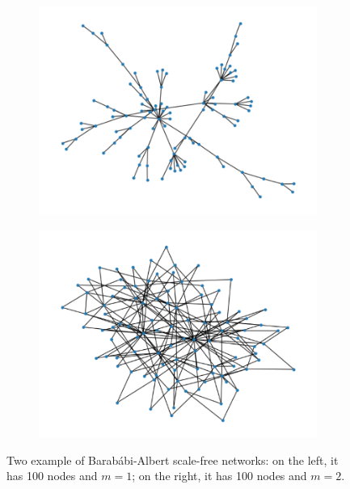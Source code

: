 \begin{figure}[ht!]
    \centering
    \begin{subfigure}[t]{0.49\textwidth}
        \centering
        \includegraphics[width=\linewidth]{image/B_A_N100_m1.png}
    \end{subfigure}
    \hfill
    \begin{subfigure}[t]{0.49\textwidth}
        \centering
        \includegraphics[width=\linewidth]{image/B_A_N100_m2.png}
    \end{subfigure}
    \caption{Two example of Barab\'abi-Albert scale-free networks: on the left, it has 100 nodes and $m=1$; on the right, it has 100 nodes and $m=2$.}
    \label{B-A_example}
\end{figure}

